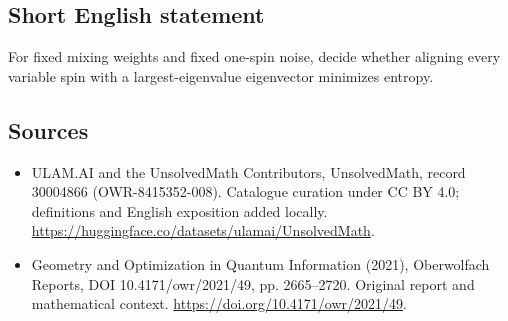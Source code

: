 \documentclass[11pt]{article}
\begin{document}
\subsection{Short English statement}
For fixed mixing weights and fixed one-spin noise, decide whether aligning every variable spin with a largest-eigenvalue eigenvector minimizes entropy.
\subsection{Sources}
\begin{itemize}
\item[\hypertarget{source:30004866:1}{S1}] ULAM.AI and the UnsolvedMath Contributors, UnsolvedMath, record 30004866 (OWR-8415352-008). Catalogue curation under CC BY 4.0; definitions and English exposition added locally.
\url{https://huggingface.co/datasets/ulamai/UnsolvedMath}.
\item[\hypertarget{source:30004866:2}{S2}] Geometry and Optimization in Quantum Information (2021), Oberwolfach Reports, DOI 10.4171/owr/2021/49, pp. 2665--2720. Original report and mathematical context.
\url{https://doi.org/10.4171/owr/2021/49}.
\end{itemize}
\label{end:30004866}
\end{document}
